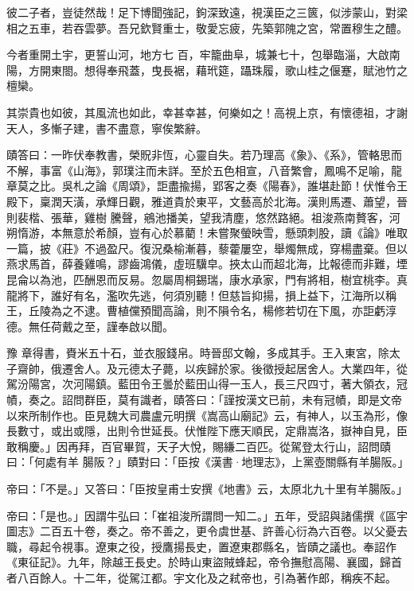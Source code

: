 \begin{pinyinscope}
 彼二子者，豈徒然哉！足下博聞強記，鉤深致遠，視漢臣之三篋，似涉蒙山，對梁相之五車，若吞雲夢。吾兄欽賢重士，敬愛忘疲，先築郭隗之宮，常置穆生之醴。



 今者重開土宇，更誓山河，地方七
 百，牢籠曲阜，城兼七十，包舉臨淄，大啟南陽，方開東閤。想得奉飛蓋，曳長裾，藉玳筵，躡珠履，歌山桂之偃蹇，賦池竹之檀欒。



 其崇貴也如彼，其風流也如此，幸甚幸甚，何樂如之！高視上京，有懷德祖，才謝天人，多慚子建，書不盡意，寧俟繁辭。



 賾答曰：一昨伏奉教書，榮貺非恆，心靈自失。若乃理高《象》、《系》，管輅思而不解，事富《山海》，郭璞注而未詳。至於五色相宣，八音繁會，鳳鳴不足喻，龍章莫之比。吳札之論《周頌》，詎盡揄揚，郢客之奏《陽春》，誰堪赴節！伏惟令王殿下，稟潤天潢，承輝日觀，雅道貴於東平，文藝高於北海。漢則馬遷、蕭望，晉則裴楷、張華，雞樹
 騰聲，鵷池播美，望我清塵，悠然路絕。祖浚燕南贅客，河朔惰游，本無意於希顏，豈有心於慕藺！未嘗聚螢映雪，懸頭刺股，讀《論》唯取一篇，披《莊》不過盈尺。復況桑榆漸暮，藜藿屢空，舉燭無成，穿楊盡棄。但以燕求馬首，薛養雞鳴，謬齒鴻儀，虛班驥皁。挾太山而超北海，比報德而非難，堙昆侖以為池，匹酬恩而反易。忽屬周桐錫瑞，康水承家，門有將相，樹宜桃李。真龍將下，誰好有名，濫吹先逃，何須別聽！但慈旨抑揚，損上益下，江海所以稱王，丘陵為之不逮。曹植儻預聞高論，則不隕令名，楊修若切在下風，亦詎虧淳德。無任荷戴之至，謹奉啟以聞。



 豫
 章得書，賚米五十石，並衣服錢帛。時晉邸文翰，多成其手。王入東宮，除太子齋帥，俄遷舍人。及元德太子薨，以疾歸於家。後徵授起居舍人。大業四年，從駕汾陽宮，次河陽鎮。藍田令王曇於藍田山得一玉人，長三尺四寸，著大領衣，冠幘，奏之。詔問群臣，莫有識者，賾答曰：「謹按漢文已前，未有冠幘，即是文帝以來所制作也。臣見魏大司農盧元明撰《嵩高山廟記》云，有神人，以玉為形，像長數寸，或出或隱，出則令世延長。伏惟陛下應天順民，定鼎嵩洛，嶽神自見，臣敢稱慶。」因再拜，百官畢賀，天子大悅，賜縑二百匹。從駕登太行山，詔問賾曰：「何處有羊
 腸阪？」賾對曰：「臣按《漢書·地理志》，上黨壺關縣有羊腸阪。」



 帝曰：「不是。」又答曰：「臣按皇甫士安撰《地書》云，太原北九十里有羊腸阪。」



 帝曰：「是也。」因謂牛弘曰：「崔祖浚所謂問一知二。」五年，受詔與諸儒撰《區宇圖志》二百五十卷，奏之。帝不善之，更令虞世基、許善心衍為六百卷。以父憂去職，尋起令視事。遼東之役，授鷹揚長史，置遼東郡縣名，皆賾之議也。奉詔作《東征記》。九年，除越王長史。於時山東盜賊蜂起，帝令撫慰高陽、襄國，歸首者八百餘人。十二年，從駕江都。宇文化及之弒帝也，引為著作郎，稱疾不起。




\end{pinyinscope}
